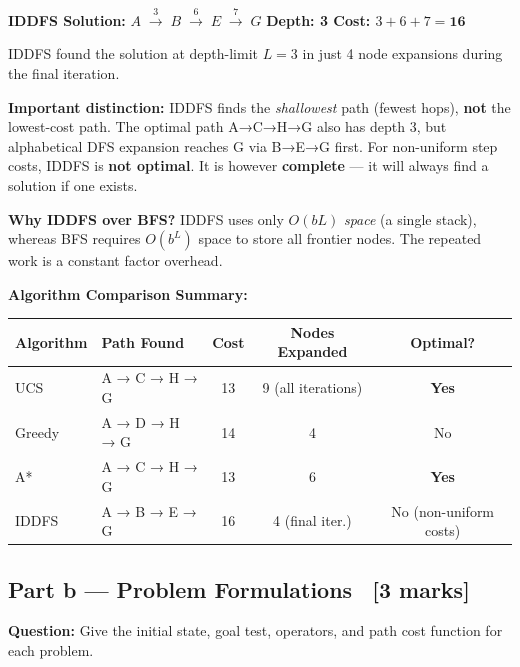 \documentclass[12pt, a4paper]{article}
\newenvironment{solutionbox}{\begin{mdframed}[style=solutionframe]}{\end{mdframed}}
\newenvironment{answerbox}{\begin{mdframed}[style=answerframe]}{\end{mdframed}}
\begin{document}
\begin{answerbox}
\textbf{IDDFS Solution:} $A \;\xrightarrow{3}\; B \;\xrightarrow{6}\; E \;\xrightarrow{7}\; G$
\hfill \textbf{Depth: 3 \quad Cost: $3+6+7 = \mathbf{16}$}

IDDFS found the solution at depth-limit $L=3$ in just 4 node expansions during the final iteration.

\textbf{Important distinction:} IDDFS finds the \emph{shallowest} path (fewest hops), \textbf{not} the lowest-cost path. The optimal path A→C→H→G also has depth 3, but alphabetical DFS expansion reaches G via B→E→G first. For non-uniform step costs, IDDFS is \textbf{not optimal}. It is however \textbf{complete} — it will always find a solution if one exists.

\textbf{Why IDDFS over BFS?} IDDFS uses only $O(bL)$ \emph{space} (a single stack), whereas BFS requires $O(b^L)$ space to store all frontier nodes. The repeated work is a constant factor overhead.
\end{answerbox}

\vspace{0.8em}

\noindent\textbf{Algorithm Comparison Summary:}
\begin{center}
\renewcommand{\arraystretch}{1.3}
\begin{tabular}{l|l|c|c|c}
\toprule
\textbf{Algorithm} & \textbf{Path Found} & \textbf{Cost} & \textbf{Nodes Expanded} & \textbf{Optimal?} \\
\midrule
UCS    & A → C → H → G & 13 & 9 (all iterations) & \textbf{Yes} \\
Greedy & A → D → H → G & 14 & 4                  & No \\
A*     & A → C → H → G & 13 & 6                  & \textbf{Yes} \\
IDDFS  & A → B → E → G & 16 & 4 (final iter.)    & No (non-uniform costs) \\
\bottomrule
\end{tabular}
\end{center}

\subsection{Part b — Problem Formulations \ [3 marks]}

\begin{solutionbox}
\textbf{Question:} Give the initial state, goal test, operators, and path cost function for each problem.
\end{solutionbox}
\end{document}
